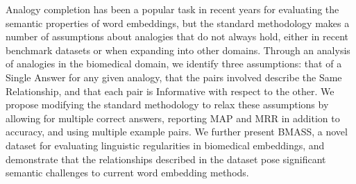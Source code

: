 Analogy completion has been a popular task in recent years for evaluating the semantic properties of word embeddings, but the standard methodology makes a number of assumptions about analogies that do not always hold, either in recent benchmark datasets or when expanding into other domains.  Through an analysis of analogies in the biomedical domain, we identify three assumptions: that of a Single Answer for any given analogy, that the pairs involved describe the Same Relationship, and that each pair is Informative with respect to the other. We propose modifying the standard methodology to relax these assumptions by allowing for multiple correct answers, reporting MAP and MRR in addition to accuracy, and using multiple example pairs.  We further present BMASS, a novel dataset for evaluating linguistic regularities in biomedical embeddings, and demonstrate that the relationships described in the dataset pose significant semantic challenges to current word embedding methods.
